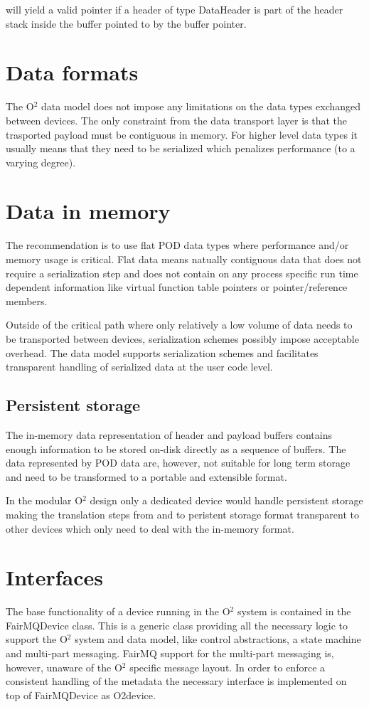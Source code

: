 \documentclass[a4paper,twoside]{article}
\def\O2{O$^2$}
\begin{document}
will yield a valid pointer if a header of type DataHeader is part of the header stack inside the buffer pointed to by the buffer pointer.

\section{Data formats}

The \O2 data model does not impose any limitations on the data types exchanged between devices. The only constraint from the data transport layer is that the trasported payload must be contiguous in memory. For higher level data types it usually means that they need to be serialized which penalizes performance (to a varying degree).

\section{Data in memory}
The recommendation is to use flat POD data types where performance and/or memory usage is critical. Flat data means natually contiguous data that does not require a serialization step and does not contain on any process specific run time dependent information like virtual function table pointers or pointer/reference members.

Outside of the critical path where only relatively a low volume of data needs to be transported between devices, serialization schemes possibly impose acceptable overhead. The data model supports serialization schemes and facilitates transparent handling of serialized data at the user code level.

\subsection{Persistent storage}
The in-memory data representation of header and payload buffers contains enough information to be stored on-disk directly as a sequence of buffers. The data represented by POD data are, however, not suitable for long term storage and need to be transformed to a portable and extensible format.

In the modular \O2 design only a dedicated device would handle persistent storage making the translation steps from and to peristent storage format transparent to other devices which only need to deal with the in-memory format.

\section{Interfaces}
The base functionality of a device running in the \O2 system is contained in the FairMQDevice class. This is a generic class providing all the necessary logic to support the \O2 system and data model, like control abstractions, a state machine and multi-part messaging. FairMQ support for the multi-part messaging is, however, unaware of the \O2 specific message layout. In order to enforce a consistent handling of the metadata the necessary interface is implemented on top of FairMQDevice as O2device.
\end{document}
